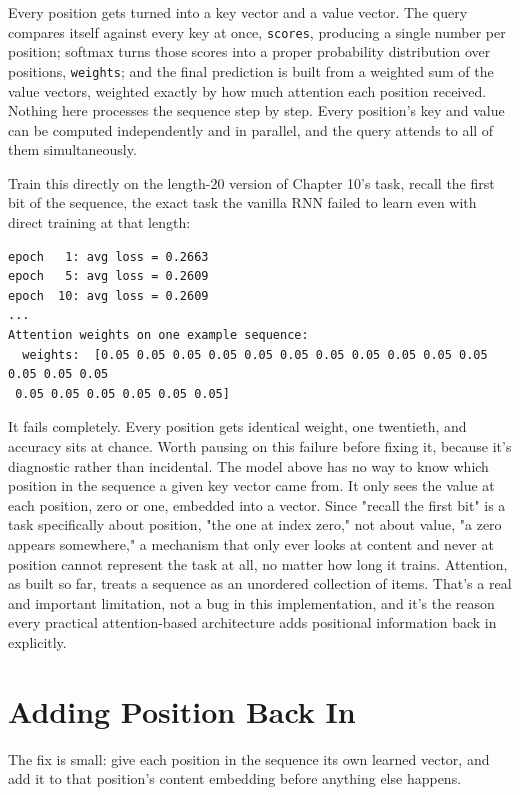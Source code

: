 Every position gets turned into a key vector and a value vector. The query compares itself against every key at once, \texttt{scores}, producing a single number per position; softmax turns those scores into a proper probability distribution over positions, \texttt{weights}; and the final prediction is built from a weighted sum of the value vectors, weighted exactly by how much attention each position received. Nothing here processes the sequence step by step. Every position's key and value can be computed independently and in parallel, and the query attends to all of them simultaneously.

Train this directly on the length-20 version of Chapter 10's task, recall the first bit of the sequence, the exact task the vanilla RNN failed to learn even with direct training at that length:

\begin{Verbatim}[fontsize=\small, frame=single, xleftmargin=1em, xrightmargin=1em]
epoch   1: avg loss = 0.2663
epoch   5: avg loss = 0.2609
epoch  10: avg loss = 0.2609
...
Attention weights on one example sequence:
  weights:  [0.05 0.05 0.05 0.05 0.05 0.05 0.05 0.05 0.05 0.05 0.05 0.05 0.05 0.05
 0.05 0.05 0.05 0.05 0.05 0.05]
\end{Verbatim}

It fails completely. Every position gets identical weight, one twentieth, and accuracy sits at chance. Worth pausing on this failure before fixing it, because it's diagnostic rather than incidental. The model above has no way to know which position in the sequence a given key vector came from. It only sees the value at each position, zero or one, embedded into a vector. Since "recall the first bit" is a task specifically about position, "the one at index zero," not about value, "a zero appears somewhere," a mechanism that only ever looks at content and never at position cannot represent the task at all, no matter how long it trains. Attention, as built so far, treats a sequence as an unordered collection of items. That's a real and important limitation, not a bug in this implementation, and it's the reason every practical attention-based architecture adds positional information back in explicitly.

\section*{Adding Position Back In}

The fix is small: give each position in the sequence its own learned vector, and add it to that position's content embedding before anything else happens.

